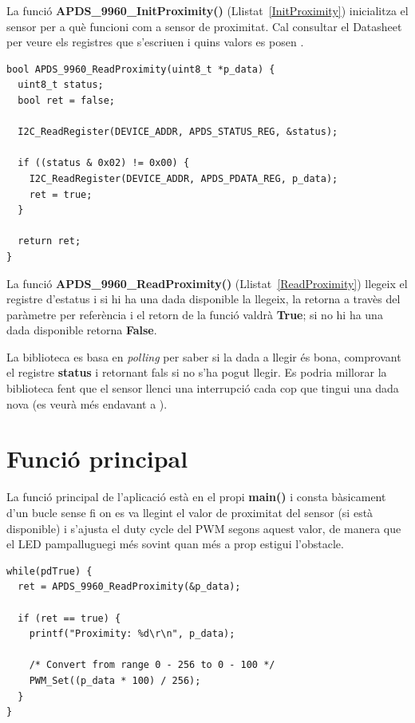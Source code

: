 La funció {\bf APDS\_9960\_InitProximity()} (Llistat~\ref{InitProximity}) inicialitza el sensor per a què funcioni com a sensor de proximitat. Cal consultar el Datasheet per veure els registres que s'escriuen i quins valors es posen \cite{apds9960}.

\begin{lstlisting}[caption={Funció {\bf APDS\_9960\_ReadProximity()}},style=customc,label=ReadProximity]
bool APDS_9960_ReadProximity(uint8_t *p_data) {
  uint8_t status;
  bool ret = false;

  I2C_ReadRegister(DEVICE_ADDR, APDS_STATUS_REG, &status);

  if ((status & 0x02) != 0x00) {
    I2C_ReadRegister(DEVICE_ADDR, APDS_PDATA_REG, p_data);
    ret = true;
  }

  return ret;
}
\end{lstlisting}

La funció {\bf APDS\_9960\_ReadProximity()} (Llistat~\ref{ReadProximity}) llegeix el registre d'estatus i si hi ha una dada disponible la llegeix, la retorna a travès del paràmetre per referència i el retorn de la funció valdrà {\bf True}; si no hi ha una dada disponible retorna {\bf False}.

La biblioteca es basa en {\em polling} per saber si la dada a llegir és bona, comprovant el registre {\bf status} i retornant fals si no s'ha pogut llegir. Es podria millorar la biblioteca fent que el sensor llenci una interrupció cada cop que tingui una dada nova (es veurà més endavant a ).

\section{Funció principal}
La funció principal de l'aplicació està en el propi {\bf main()} i consta bàsicament d'un bucle sense fi on es va llegint el valor de proximitat del sensor (si està disponible) i s'ajusta el \gls{duty cycle} del \gls{PWM} segons aquest valor, de manera que el LED pampalluguegi més sovint quan més a prop estigui l'obstacle.

\begin{lstlisting}[caption={Funció principal},style=customc,label=ProximityExample]
while(pdTrue) {
  ret = APDS_9960_ReadProximity(&p_data);

  if (ret == true) {
    printf("Proximity: %d\r\n", p_data);

    /* Convert from range 0 - 256 to 0 - 100 */
    PWM_Set((p_data * 100) / 256);
  }
}
\end{lstlisting}

